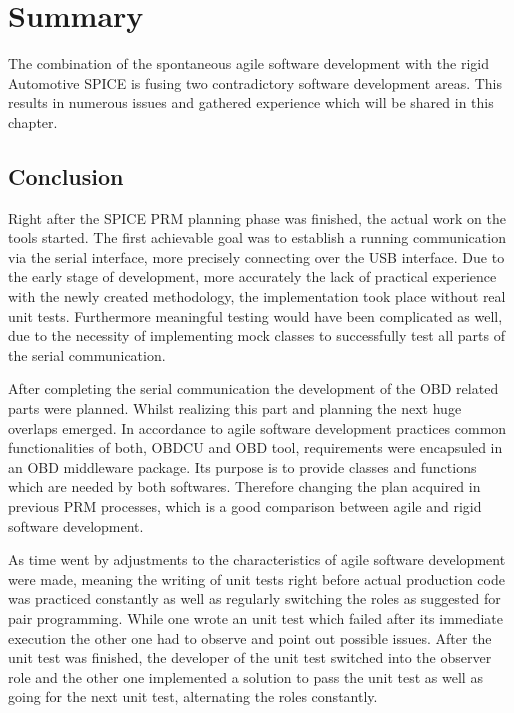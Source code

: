 

\chapter{Summary}
\label{sec:summary}
The combination of the spontaneous agile software development with the rigid Automotive SPICE is fusing two contradictory software development areas. 
This results in numerous issues and gathered experience which will be shared in this chapter.

\section{Conclusion}
\label{sec:conclusion}

Right after the SPICE PRM planning phase was finished, the actual work on the tools started. The first achievable goal was to establish a 
running communication via the serial interface, more precisely connecting over the USB interface. Due to the early stage of development, more 
accurately the lack of practical experience with the newly created methodology, the implementation took place without real unit tests. 
Furthermore meaningful testing would have been complicated as well, due to the necessity of implementing mock classes to successfully test 
all parts of the serial communication.

After completing the serial communication the development of the OBD related parts were planned. Whilst realizing this part and planning the next 
huge overlaps emerged. In accordance to agile software development practices common functionalities of both, OBDCU and OBD tool, requirements were 
encapsuled in an OBD middleware package. Its purpose is to provide classes and functions which are needed by both softwares. Therefore changing the 
plan acquired in previous PRM processes, which is a good comparison between agile and rigid software development.

As time went by adjustments to the characteristics of agile software development were made, meaning the writing of unit tests right before actual 
production code was practiced constantly as well as regularly switching the roles as suggested for pair programming. While one wrote an unit 
test which failed after its immediate execution the other one had to observe and point out possible issues. After the unit test was finished, 
the developer of the unit test switched into the observer role and the other one implemented a solution to pass the unit test as well as going 
for the next unit test, alternating the roles constantly.

